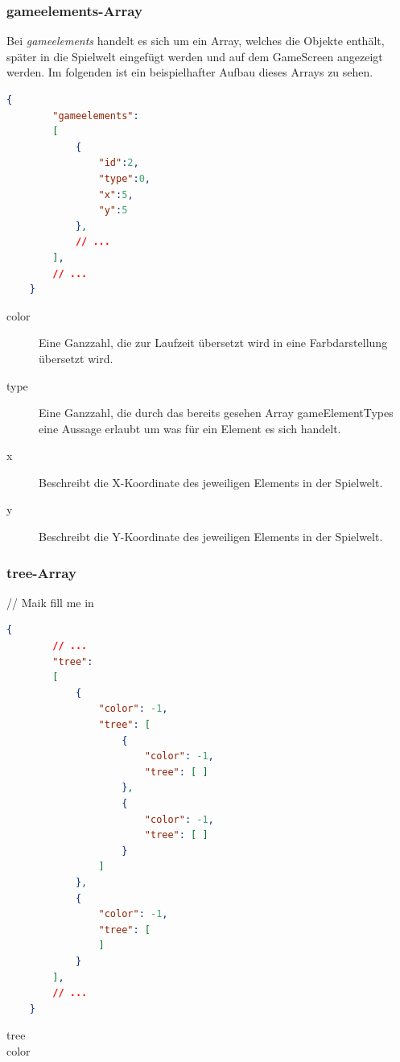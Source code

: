 \documentclass[11pt,a4paper]{report}
\begin{document}
\begin{minipage}{1\textwidth}

\subsubsection{gameelements-Array}

Bei \textit{gameelements} handelt es sich um ein Array, welches die Objekte enthält, später in die Spielwelt eingefügt werden und auf dem GameScreen angezeigt werden. Im folgenden ist ein beispielhafter Aufbau dieses Arrays zu sehen.

\begin{lstlisting}[language=json,firstnumber=1] 
	{
		"gameelements":
		[  
			{  
				"id":2,
				"type":0,
				"x":5,
				"y":5
			},
			// ...
		],
		// ...
	}
\end{lstlisting}

\begin{description}
	\item[color] Eine Ganzzahl, die zur Laufzeit übersetzt wird in eine Farbdarstellung übersetzt wird.
	\item[type] Eine Ganzzahl, die durch das bereits gesehen Array gameElementTypes eine Aussage erlaubt um was für ein Element es sich handelt.
	\item[x] Beschreibt die X-Koordinate des jeweiligen Elements in der Spielwelt.
	\item[y] Beschreibt die Y-Koordinate des jeweiligen Elements in der Spielwelt.
\end{description}

\end{minipage}


\begin{minipage}{1\textwidth}

\subsubsection{tree-Array}

// Maik fill me in

\begin{lstlisting}[language=json,firstnumber=1] 
	{	
		// ...
		"tree": 
		[
		    {
		        "color": -1,
		        "tree": [
		            {
		                "color": -1,
		                "tree": [ ]
		            },
		            {
		                "color": -1,
		                "tree": [ ]
		            }
		        ]
		    },
		    {
		        "color": -1,
		        "tree": [
		        ]
		    }
		],
		// ...
	}
\end{lstlisting}

\begin{description}
	\item[tree]
	\item[color]
\end{description}

\end{minipage}
\end{document}
